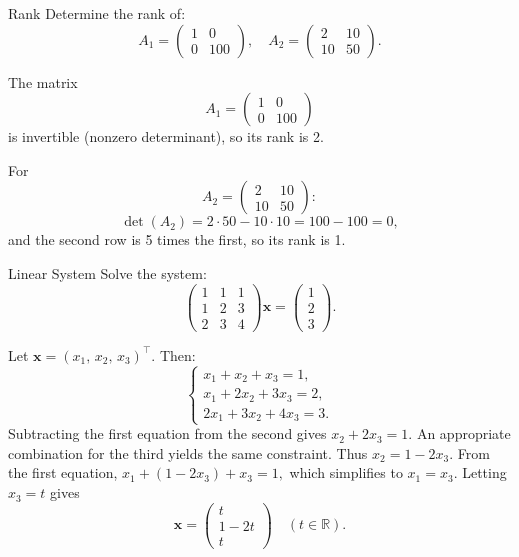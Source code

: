 \documentclass{article}
\begin{document}
\begin{exercise}{Rank}
  Determine the rank of:
  \[
    A_1 = \begin{pmatrix} 1 & 0 \\ 0 & 100 \end{pmatrix},
    \quad
    A_2 = \begin{pmatrix} 2 & 10 \\ 10 & 50 \end{pmatrix}.
  \]
  
  \begin{solution}
    The matrix 
    \[
      A_1 = \begin{pmatrix} 1 & 0 \\ 0 & 100 \end{pmatrix}
    \]
    is invertible (nonzero determinant), so its rank is 2.

    For 
    \[
      A_2 = \begin{pmatrix} 2 & 10 \\ 10 & 50 \end{pmatrix}:
    \]
    \[
      \det(A_2) = 2\cdot50 - 10\cdot10 = 100 - 100 = 0,
    \]
    and the second row is 5 times the first, so its rank is 1.
  \end{solution}
\end{exercise}

\begin{exercise}{Linear System}
  Solve the system:
  \[
    \begin{pmatrix}
      1 & 1 & 1 \\
      1 & 2 & 3 \\
      2 & 3 & 4
    \end{pmatrix}
    \mathbf{x}
    =
    \begin{pmatrix}
      1 \\ 2 \\ 3
    \end{pmatrix}.
  \]
  
  \begin{solution}
    Let $\mathbf{x} = (x_1,\,x_2,\,x_3)^\top$. Then:
    \[
      \begin{cases}
        x_1 + x_2 + x_3 = 1,\\
        x_1 + 2x_2 + 3x_3 = 2,\\
        2x_1 + 3x_2 + 4x_3 = 3.
      \end{cases}
    \]
    Subtracting the first equation from the second gives $x_2 + 2x_3 = 1.$ 
    An appropriate combination for the third yields the same constraint. 
    Thus $x_2 = 1 - 2x_3.$ 
    From the first equation, $x_1 + (1 - 2x_3) + x_3 = 1,$ which simplifies to $x_1 = x_3.$ 
    Letting $x_3 = t$ gives
    \[
      \mathbf{x} = 
      \begin{pmatrix}
        t \\[3pt]
        1 - 2t \\[3pt]
        t
      \end{pmatrix}
      \quad (t \in \mathbb{R}).
    \]
  \end{solution}
\end{exercise}
\end{document}
